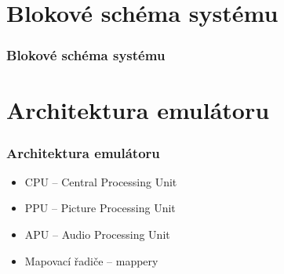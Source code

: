 \documentclass{beamer}
\begin{document}

\section{Blokové schéma systému}

\begin{frame}
\frametitle{Blokové schéma systému}

\centering
\vspace{0.1cm}


\end{frame}

\section{Architektura emulátoru}

\begin{frame}
\frametitle{Architektura emulátoru}

\begin{itemize}
    \item CPU -- Central Processing Unit
    \item PPU -- Picture Processing Unit
    \item APU -- Audio Processing Unit
    \item Mapovací řadiče -- mappery
\end{itemize}

\centering


\end{frame}
\end{document}
